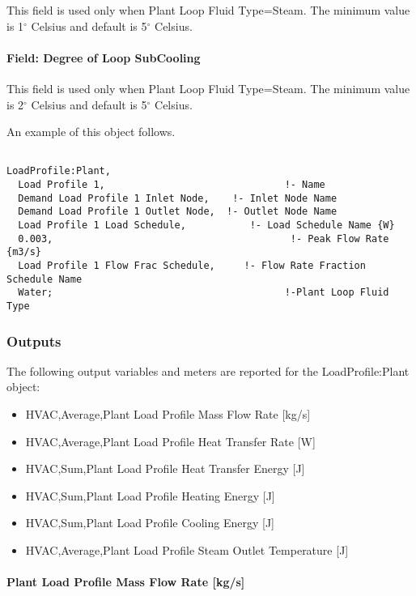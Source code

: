 This field is used only when Plant Loop Fluid Type=Steam. The minimum value is 1$^\circ$ Celsius and default is 5$^\circ$ Celsius.

\paragraph{Field: Degree of Loop SubCooling}\label{field-degree-of-loop-subcooling-load-profile}

This field is used only when Plant Loop Fluid Type=Steam. The minimum value is 2$^\circ$ Celsius and default is 5$^\circ$ Celsius.

An example of this object follows.

\begin{lstlisting}

LoadProfile:Plant,
  Load Profile 1,                               !- Name
  Demand Load Profile 1 Inlet Node,    !- Inlet Node Name
  Demand Load Profile 1 Outlet Node,  !- Outlet Node Name
  Load Profile 1 Load Schedule,           !- Load Schedule Name {W}
  0.003,                                         !- Peak Flow Rate {m3/s}
  Load Profile 1 Flow Frac Schedule,     !- Flow Rate Fraction Schedule Name
  Water;                                        !-Plant Loop Fluid Type
\end{lstlisting}

\subsubsection{Outputs}\label{outputs-020}

The following output variables and meters are reported for the LoadProfile:Plant object:

\begin{itemize}
\item
  HVAC,Average,Plant Load Profile Mass Flow Rate {[}kg/s{]}
\item
  HVAC,Average,Plant Load Profile Heat Transfer Rate {[}W{]}
\item
  HVAC,Sum,Plant Load Profile Heat Transfer Energy {[}J{]}
\item
  HVAC,Sum,Plant Load Profile Heating Energy {[}J{]}
\item
  HVAC,Sum,Plant Load Profile Cooling Energy {[}J{]}
\item
  HVAC,Average,Plant Load Profile Steam Outlet Temperature {[}J{]}
\end{itemize}

\paragraph{Plant Load Profile Mass Flow Rate {[}kg/s{]}}\label{plant-load-profile-mass-flow-rate-kgs}

